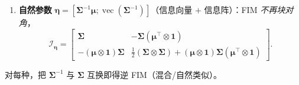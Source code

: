 \begin{proposition}
\begin{enumerate}
  \begin{equation}
    \boldsymbol{\mathcal{I}}_{\boldsymbol{\alpha}}=\begin{bmatrix}\boldsymbol{\Sigma}^{-1}&\mathbf{0}\\\mathbf{0}&\tfrac12\big(\boldsymbol{\Sigma}\otimes\boldsymbol{\Sigma}\big)\end{bmatrix}.
    \label{eq:matderiv-gauss-fim-hybrid}
  \end{equation}
  \item \textbf{自然参数} $\boldsymbol{\eta}=[\boldsymbol{\Sigma}^{-1}\boldsymbol{\mu};\operatorname{vec}(\boldsymbol{\Sigma}^{-1})]$（信息向量 $+$ 信息阵）：FIM \emph{不再块对角}，
  \begin{equation}
    \boldsymbol{\mathcal{I}}_{\boldsymbol{\eta}}=\begin{bmatrix}\boldsymbol{\Sigma}&-\boldsymbol{\Sigma}(\boldsymbol{\mu}^\top\otimes\mathbf{1})\\-(\boldsymbol{\mu}\otimes\mathbf{1})\boldsymbol{\Sigma}&\tfrac12(\boldsymbol{\Sigma}\otimes\boldsymbol{\Sigma})+(\boldsymbol{\mu}\otimes\mathbf{1})\boldsymbol{\Sigma}(\boldsymbol{\mu}^\top\otimes\mathbf{1})\end{bmatrix}.
    \label{eq:matderiv-gauss-fim-natural}
  \end{equation}
\end{enumerate}
对每种，把 $\boldsymbol{\Sigma}^{-1}$ 与 $\boldsymbol{\Sigma}$ 互换即得逆 FIM（混合/自然类似）。
\end{proposition}
